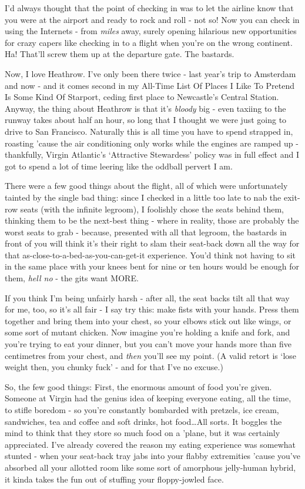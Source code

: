 \documentclass[a5paper,10pt,titlepage,draft]{book}
\begin{document}
I'd always thought that the point of checking in was to let the airline know that you were at the airport and ready to rock and roll - not so!  Now you can check in using the Internets - from \emph{miles} away, surely opening hilarious new opportunities for crazy capers like checking in to a flight when you're on the wrong continent.  Ha!  That'll screw them up at the departure gate.  The bastards.

Now, I love Heathrow.  I've only been there twice - last year's trip to Amsterdam and now - and it comes second in my All-Time List Of Places I Like To Pretend Is Some Kind Of Starport, ceding first place to Newcastle's Central Station.  Anyway, the thing about Heathrow is that it's \emph{bloody} big - even taxiing to the runway takes about half an hour, so long that I thought we were just going to drive to San Francisco.  Naturally this is all time you have to spend strapped in, roasting 'cause the air conditioning only works while the engines are ramped up - thankfully, Virgin Atlantic's `Attractive Stewardess' policy was in full effect and I got to spend a lot of time leering like the oddball pervert I am.

There were a few good things about the flight, all of which were unfortunately tainted by the single bad thing: since I checked in a little too late to nab the exit-row seats (with the infinite legroom), I foolishly chose the seats behind them, thinking them to be the next-best thing - where in reality, those are probably the worst seats to grab - because, presented with all that legroom, the bastards in front of you will think it's their right to slam their seat-back down all the way for that as-close-to-a-bed-as-you-can-get-it experience.  You'd think not having to sit in the same place with your knees bent for nine or ten hours would be enough for them, \emph{hell no} - the gits want MORE.

If you think I'm being unfairly harsh - after all, the seat backs tilt all that way for me, too, so it's all fair - I say try this:  make fists with your hands.  Press them together and bring them into your chest, so your elbows stick out like wings, or some sort of mutant chicken.  Now imagine you're holding a knife and fork, and you're trying to eat your dinner, but you can't move your hands more than five centimetres from your chest, and \emph{then} you'll see my point.  (A valid retort is `lose weight then, you chunky fuck' - and for that I've no excuse.)

So, the few good things:  First, the enormous amount of food you're given.  Someone at Virgin had the genius idea of keeping everyone eating, all the time, to stifle boredom - so you're constantly bombarded with pretzels, ice cream, sandwiches, tea and coffee and soft drinks, hot food\ldots  All sorts.  It boggles the mind to think that they store so much food on a 'plane, but it was certainly appreciated.  I've already covered the reason my eating experience was somewhat stunted - when your seat-back tray jabs into your flabby extremities 'cause you've absorbed all your allotted room like some sort of amorphous jelly-human hybrid, it kinda takes the fun out of stuffing your floppy-jowled face.
\end{document}
